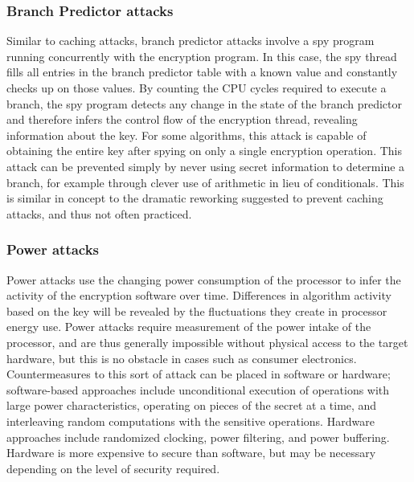 \documentclass[times, 10pt,twocolumn]{article}
\begin{document}
\subsubsection{Branch Predictor attacks}
Similar to caching attacks, branch predictor attacks involve a spy program running concurrently with the encryption program.  In this case, the spy thread fills all entries in the branch predictor table with a known value and constantly checks up on those values.  By counting the CPU cycles required to execute a branch, the spy program detects any change in the state of the branch predictor and therefore infers the control flow of the encryption thread, revealing information about the key.  For some algorithms, this attack is capable of obtaining the entire key after spying on only a single encryption operation\cite{branchpredict}.  This attack can be prevented simply by never using secret information to determine a branch, for example through clever use of arithmetic in lieu of conditionals.  This is similar in concept to the dramatic reworking suggested to prevent caching attacks, and thus not often practiced.

\subsubsection{Power attacks}
Power attacks use the changing power consumption of the processor to infer the activity of the encryption software over time.  Differences in algorithm activity based on the key will be revealed by the fluctuations they create in processor energy use.  Power attacks require measurement of the power intake of the processor, and are thus generally impossible without physical access to the target hardware, but this is no obstacle in cases such as consumer electronics.  Countermeasures to this sort of attack can be placed in software or hardware; software-based approaches include unconditional execution of operations with large power characteristics, operating on pieces of the secret at a time, and interleaving random computations with the sensitive operations.  Hardware approaches include randomized clocking, power filtering, and power buffering.  Hardware is more expensive to secure than software, but may be necessary depending on the level of security required.\cite{mmthesis}
\end{document}
